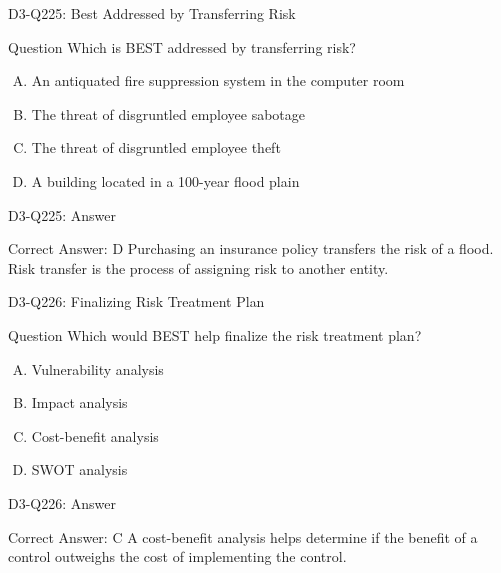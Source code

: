 \documentclass{beamer}
\begin{document}
	\begin{frame}{D3-Q225: Best Addressed by Transferring Risk}
		\begin{block}{Question}
			Which is BEST addressed by transferring risk?
		\end{block}
		\begin{enumerate}[(A)]
			\item An antiquated fire suppression system in the computer room
			\item The threat of disgruntled employee sabotage
			\item The threat of disgruntled employee theft
			\item A building located in a 100-year flood plain
		\end{enumerate}
	\end{frame}
	\begin{frame}{D3-Q225: Answer}
		\begin{block}{Correct Answer: D}
			Purchasing an insurance policy transfers the risk of a flood. Risk transfer is the process of assigning risk to another entity.
		\end{block}
	\end{frame}
	
	\begin{frame}{D3-Q226: Finalizing Risk Treatment Plan}
		\begin{block}{Question}
			Which would BEST help finalize the risk treatment plan?
		\end{block}
		\begin{enumerate}[(A)]
			\item Vulnerability analysis
			\item Impact analysis
			\item Cost-benefit analysis
			\item SWOT analysis
		\end{enumerate}
	\end{frame}
	\begin{frame}{D3-Q226: Answer}
		\begin{block}{Correct Answer: C}
			A cost-benefit analysis helps determine if the benefit of a control outweighs the cost of implementing the control.
		\end{block}
	\end{frame}
	
\end{document}
